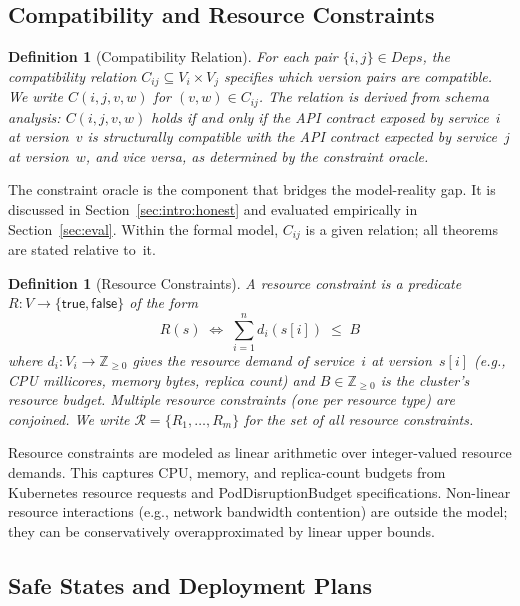 \documentclass[10pt,twocolumn]{article}
\newtheorem{definition}[theorem]{Definition}
\begin{document}
\subsection{Compatibility and Resource Constraints}
\label{sec:formal:constraints}

\begin{definition}[Compatibility Relation]
\label{def:compat}
For each pair $\{i,j\} \in \mathit{Deps}$, the \emph{compatibility
relation} $C_{ij} \subseteq V_i \times V_j$ specifies which version pairs
are compatible.  We write $C(i,j,v,w)$ for $(v,w) \in C_{ij}$.  The
relation is derived from schema analysis: $C(i,j,v,w)$ holds if and only
if the API contract exposed by service~$i$ at version~$v$ is structurally
compatible with the API contract expected by service~$j$ at version~$w$,
and vice versa, as determined by the constraint oracle.
\end{definition}

\noindent
The constraint oracle is the component that bridges the model-reality gap.
It is discussed in Section~\ref{sec:intro:honest} and evaluated
empirically in Section~\ref{sec:eval}.  Within the formal model, $C_{ij}$
is a given relation; all theorems are stated relative to~it.

\begin{definition}[Resource Constraints]
\label{def:resource}
A \emph{resource constraint} is a predicate $R \colon V \to
\{\mathsf{true}, \mathsf{false}\}$ of the form
\[
  R(s) \;\iff\; \sum_{i=1}^{n} d_i(s[i]) \;\leq\; B
\]
where $d_i \colon V_i \to \mathbb{Z}_{\geq 0}$ gives the resource demand
of service~$i$ at version~$s[i]$ (e.g., CPU millicores, memory bytes,
replica count) and $B \in \mathbb{Z}_{\geq 0}$ is the cluster's resource
budget.  Multiple resource constraints (one per resource type) are
conjoined.  We write $\mathcal{R} = \{R_1, \ldots, R_m\}$ for the set of
all resource constraints.
\end{definition}

\noindent
Resource constraints are modeled as linear arithmetic over integer-valued
resource demands.  This captures CPU, memory, and replica-count budgets
from Kubernetes resource requests and PodDisruptionBudget specifications.
Non-linear resource interactions (e.g., network bandwidth contention) are
outside the model; they can be conservatively overapproximated by linear
upper bounds.

\subsection{Safe States and Deployment Plans}
\label{sec:formal:safe}
\end{document}
